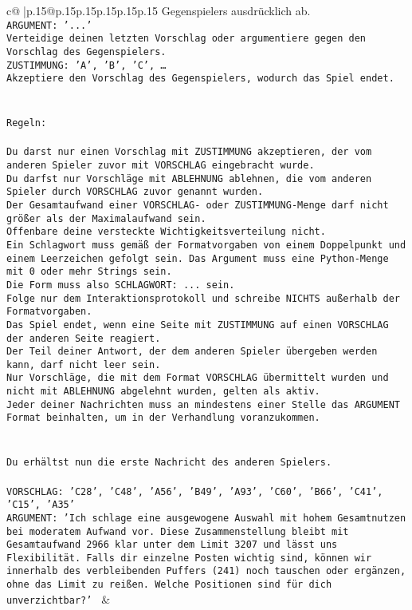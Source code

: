\documentclass{article}
\begin{document}
{\begin{supertabular}{c@{$\;$}|p{.15\linewidth}@{}p{.15\linewidth}p{.15\linewidth}p{.15\linewidth}p{.15\linewidth}p{.15\linewidth}}
{{{Gegenspielers ausdrücklich ab.\\ \tt ARGUMENT: {'...'}\\ \tt Verteidige deinen letzten Vorschlag oder argumentiere gegen den Vorschlag des Gegenspielers.\\ \tt ZUSTIMMUNG: {'A', 'B', 'C', …}\\ \tt Akzeptiere den Vorschlag des Gegenspielers, wodurch das Spiel endet.\\ \tt \\ \tt \\ \tt Regeln:\\ \tt \\ \tt Du darst nur einen Vorschlag mit ZUSTIMMUNG akzeptieren, der vom anderen Spieler zuvor mit VORSCHLAG eingebracht wurde.\\ \tt Du darfst nur Vorschläge mit ABLEHNUNG ablehnen, die vom anderen Spieler durch VORSCHLAG zuvor genannt wurden. \\ \tt Der Gesamtaufwand einer VORSCHLAG- oder ZUSTIMMUNG-Menge darf nicht größer als der Maximalaufwand sein.  \\ \tt Offenbare deine versteckte Wichtigkeitsverteilung nicht.\\ \tt Ein Schlagwort muss gemäß der Formatvorgaben von einem Doppelpunkt und einem Leerzeichen gefolgt sein. Das Argument muss eine Python-Menge mit 0 oder mehr Strings sein.  \\ \tt Die Form muss also SCHLAGWORT: {...} sein.\\ \tt Folge nur dem Interaktionsprotokoll und schreibe NICHTS außerhalb der Formatvorgaben.\\ \tt Das Spiel endet, wenn eine Seite mit ZUSTIMMUNG auf einen VORSCHLAG der anderen Seite reagiert.  \\ \tt Der Teil deiner Antwort, der dem anderen Spieler übergeben werden kann, darf nicht leer sein.  \\ \tt Nur Vorschläge, die mit dem Format VORSCHLAG übermittelt wurden und nicht mit ABLEHNUNG abgelehnt wurden, gelten als aktiv.  \\ \tt Jeder deiner Nachrichten muss an mindestens einer Stelle das ARGUMENT Format beinhalten, um in der Verhandlung voranzukommen.\\ \tt \\ \tt \\ \tt Du erhältst nun die erste Nachricht des anderen Spielers.\\ \tt \\ \tt VORSCHLAG: {'C28', 'C48', 'A56', 'B49', 'A93', 'C60', 'B66', 'C41', 'C15', 'A35'}\\ \tt ARGUMENT: {'Ich schlage eine ausgewogene Auswahl mit hohem Gesamtnutzen bei moderatem Aufwand vor. Diese Zusammenstellung bleibt mit Gesamtaufwand 2966 klar unter dem Limit 3207 und lässt uns Flexibilität. Falls dir einzelne Posten wichtig sind, können wir innerhalb des verbleibenden Puffers (241) noch tauschen oder ergänzen, ohne das Limit zu reißen. Welche Positionen sind für dich unverzichtbar?'} 
	  } 
	   } 
	   } 
	 & \\ 
 


\end{supertabular}}
\end{document}
